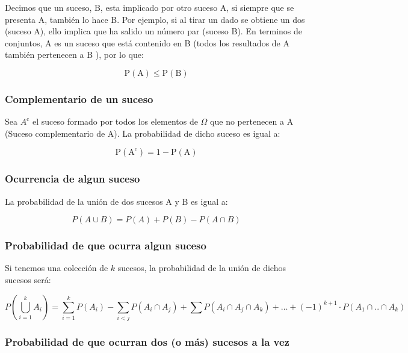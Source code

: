 \documentclass[
]{article}
\begin{document}
Decimos que un suceso, B, esta implicado por otro suceso A, si siempre que se presenta A, también lo hace B. Por ejemplo, si al tirar un dado se obtiene un dos (suceso A), ello implica que ha salido un número par (suceso B). En terminos de conjuntos, A es un suceso que está contenido en B (todos los resultados de A
también pertenecen a B ), por lo que:

\[
\mathrm{P}(\mathrm{A}) \leq \mathrm{P}(\mathrm{B})
\]

\subsubsection{Complementario de un suceso}\label{complementario-de-un-suceso}

Sea \(A^{\mathrm{c}}\) el suceso formado por todos los elementos de
\(\Omega\) que no pertenecen a A (Suceso complementario de A). La
probabilidad de dicho suceso es igual a:

\[
\mathrm{P}\left(\mathrm{A}^{\mathrm{c}}\right)=1-\mathrm{P}(\mathrm{A})
\]

\subsubsection{Ocurrencia de algun suceso}\label{ocurrencia-de-algun-suceso}

La probabilidad de la unión de dos sucesos A y B es igual a:

\[
P(A \cup B)=P(A)+P(B)-P(A \cap B)
\]

\subsubsection{Probabilidad de que ocurra algun suceso}\label{probabilidad-de-que-ocurra-algun-suceso}

Si tenemos una colección de \(k\) sucesos, la probabilidad de la unión de
dichos sucesos será:

\[
P\left(\bigcup_{i=1}^{k} A_{i}\right)=\sum_{i=1}^{k} P\left(A_{i}\right)-\sum_{i<j} P\left(A_{i} \cap A_{j}\right)+\sum P\left(A_{i} \cap A_{j} \cap A_{k}\right)+\ldots+(-1)^{k+1} \cdot P\left(A_{1} \cap . . \cap A_{k}\right)
\]

\subsubsection{Probabilidad de que ocurran dos (o más) sucesos a la vez}\label{probabilidad-de-que-ocurran-dos-o-muxe1s-sucesos-a-la-vez}
\end{document}
